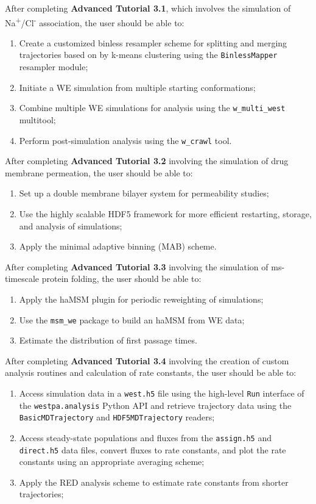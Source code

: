 After completing \textbf{Advanced Tutorial 3.1}, which involves the simulation of Na\textsuperscript{+}/Cl\textsuperscript{-} association, the user should be able to:
\begin{enumerate}
  \item Create a customized binless resampler scheme for splitting and merging trajectories based on by k-means clustering using the \verb|BinlessMapper| resampler module;
  \item Initiate a WE simulation from multiple starting conformations;
  \item Combine multiple WE simulations for analysis using the \verb|w_multi_west| multitool;
  \item Perform post-simulation analysis using the \verb|w_crawl| tool.
\end{enumerate}

After completing \textbf{Advanced Tutorial 3.2} involving the simulation of drug membrane permeation, the user should be able to:
\begin{enumerate}
  \item Set up a double membrane bilayer system for permeability studies; 
  \item Use the highly scalable HDF5 framework for more efficient restarting, storage, and analysis of simulations;
  \item Apply the minimal adaptive binning (MAB) scheme.
\end{enumerate}

After completing \textbf{Advanced Tutorial 3.3} involving the simulation of ms-timescale protein folding, the user should be able to:
\begin{enumerate}
  \item Apply the haMSM plugin for periodic reweighting of simulations;
  \item Use the \verb|msm_we| package to build an haMSM from WE data;
  \item Estimate the distribution of first passage times.
\end{enumerate}

After completing \textbf{Advanced Tutorial 3.4} involving the creation of custom analysis routines and calculation of rate constants, the user should be able to:
\begin{enumerate}
  \item Access simulation data in a \verb|west.h5| file using the high-level \verb|Run| interface of the \verb|westpa.analysis| Python API and retrieve trajectory data using the \verb|BasicMDTrajectory| and \verb|HDF5MDTrajectory| readers;
  \item Access steady-state populations and fluxes from the \verb|assign.h5| and \verb|direct.h5| data files, convert fluxes to rate constants, and plot the rate constants using an appropriate averaging scheme;
  \item Apply the RED analysis scheme to estimate rate constants from shorter trajectories;
\end{enumerate}

